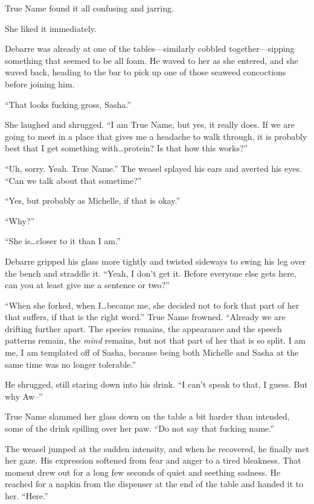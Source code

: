 True Name found it all confusing and jarring.

She liked it immediately.

Debarre was already at one of the tables---similarly cobbled together---sipping something that seemed to be all foam. He waved to her as she entered, and she waved back, heading to the bar to pick up one of those seaweed concoctions before joining him.

``That looks fucking gross, Sasha.''

She laughed and shrugged. ``I am True Name, but yes, it really does. If we are going to meet in a place that gives me a headache to walk through, it is probably best that I get something with\ldots protein? Is that how this works?''

``Uh, sorry. Yeah. True Name.'' The weasel splayed his ears and averted his eyes. ``Can we talk about that sometime?''

``Yes, but probably as Michelle, if that is okay.''

``Why?''

``She is\ldots closer to it than I am.''

Debarre gripped his glass more tightly and twisted sideways to swing his leg over the bench and straddle it. ``Yeah, I don't get it. Before everyone else gets here, can you at least give me a sentence or two?''

``When she forked, when I\ldots became me, she decided not to fork that part of her that suffers, if that is the right word.'' True Name frowned. ``Already we are drifting further apart. The species remains, the appearance and the speech patterns remain, the \emph{mind} remains, but not that part of her that is so split. I am me, I am templated off of Sasha, because being both Michelle and Sasha at the same time was no longer tolerable.''

He shrugged, still staring down into his drink. ``I can't speak to that, I guess. But why Aw--''

True Name slammed her glass down on the table a bit harder than intended, some of the drink spilling over her paw. ``Do not say that fucking name.''

The weasel jumped at the sudden intensity, and when he recovered, he finally met her gaze. His expression softened from fear and anger to a tired bleakness. That moment drew out for a long few seconds of quiet and seething sadness. He reached for a napkin from the dispenser at the end of the table and handed it to her. ``Here.''

